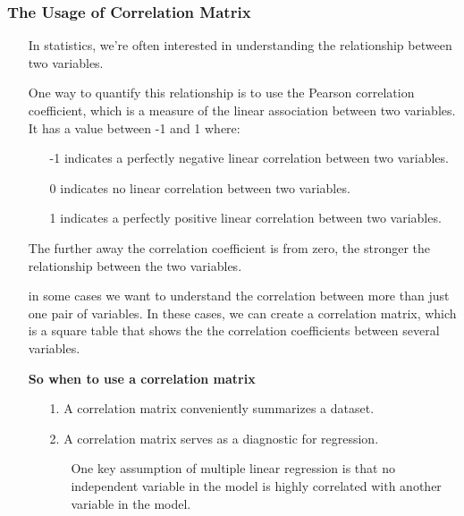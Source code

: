 \documentclass[a4paper]{article}
\begin{document}
\subsubsection{The Usage of Correlation Matrix}
\begin{itemize}
    \item[] In statistics, we’re often interested in understanding the relationship between two variables.
    
    \item[] One way to quantify this relationship is to use the Pearson correlation coefficient, which is a measure of the linear association between two variables. It has a value between -1 and 1 where:
    \begin{itemize}
        \item[] -1 indicates a perfectly negative linear correlation between two variables.
        
        \item[] 0 indicates no linear correlation between two variables.
        
        \item[] 1 indicates a perfectly positive linear correlation between two variables.
    \end{itemize}
    
    \item[] The further away the correlation coefficient is from zero, the stronger the relationship between the two variables.
    
    \item[] in some cases we want to understand the correlation between more than just one pair of variables. In these cases, we can create a correlation matrix, which is a square table that shows the the correlation coefficients between several variables.
    
    \item[] \textbf{So when to use a correlation matrix}
    \begin{itemize}
        \item[1.] A correlation matrix conveniently summarizes a dataset.
        \item[2.] A correlation matrix serves as a diagnostic for regression.
        \begin{itemize}
            \item[] One key assumption of multiple linear regression is that no independent variable in the model is highly correlated with another variable in the model.
            

\end{itemize}
\end{itemize}
\end{itemize}
\end{document}
